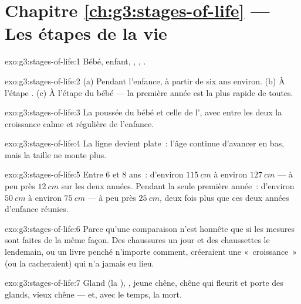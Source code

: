 \section*{Chapitre \ref{ch:g3:stages-of-life} --- Les étapes de la vie}

\begin{solution}{exo:g3:stages-of-life:1}
Bébé, enfant, , , .
\end{solution}

\begin{solution}{exo:g3:stages-of-life:2}
(a) Pendant l'enfance, à partir de six ans environ. (b) À l'étape
. (c) À l'étape du bébé --- la première année est la plus
rapide de toutes.
\end{solution}

\begin{solution}{exo:g3:stages-of-life:3}
La poussée du bébé et celle de l', avec entre les deux la
croissance calme et régulière de l'enfance.
\end{solution}

\begin{solution}{exo:g3:stages-of-life:4}
La ligne devient plate~: l'âge continue d'avancer en bas, mais la
taille ne monte plus.
\end{solution}

\begin{solution}{exo:g3:stages-of-life:5}
Entre $6$ et $8$ ans~: d'environ $\qty{115}{cm}$ à environ
$\qty{127}{cm}$ --- à peu près $\qty{12}{cm}$ sur les deux années.
Pendant la seule première année~: d'environ $\qty{50}{cm}$ à environ
$\qty{75}{cm}$ --- à peu près $\qty{25}{cm}$, deux fois plus que ces
deux années d'enfance réunies.
\end{solution}

\begin{solution}{exo:g3:stages-of-life:6}
Parce qu'une comparaison n'est honnête que si les mesures sont
faites de la même façon. Des chaussures un jour et des chaussettes
le lendemain, ou un livre penché n'importe comment, créeraient une
«~croissance~» (ou la cacheraient) qui n'a jamais eu lieu.
\end{solution}

\begin{solution}{exo:g3:stages-of-life:7}
Gland (la ), , jeune chêne, chêne  qui
fleurit et porte des glands, vieux chêne --- et, avec le temps, la
mort.
\end{solution}

